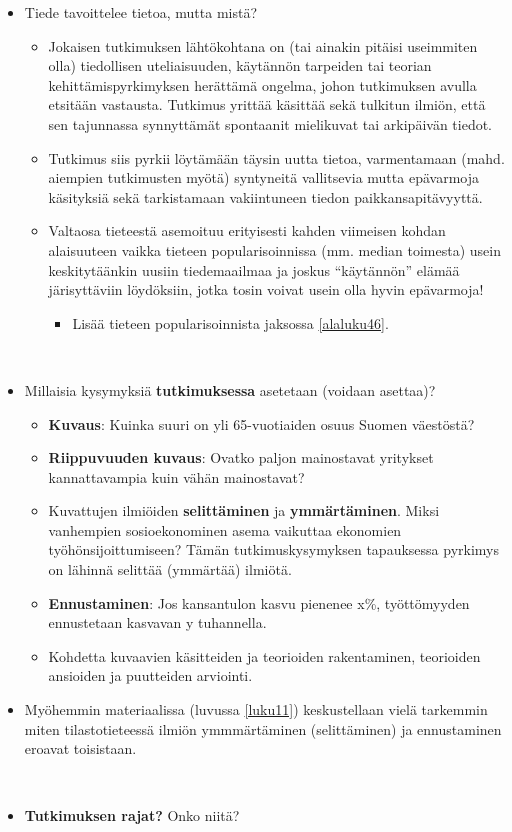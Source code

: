 \documentclass[
]{book}
\providecommand{\tightlist}{%
  \setlength{\itemsep}{0pt}\setlength{\parskip}{0pt}}
\begin{document}
\begin{itemize}
\tightlist
\item
  Tiede tavoittelee tietoa, mutta mistä?

  \begin{itemize}
  \tightlist
  \item
    Jokaisen tutkimuksen lähtökohtana on (tai ainakin pitäisi useimmiten olla) tiedollisen uteliaisuuden, käytännön tarpeiden tai teorian kehittämispyrkimyksen herättämä ongelma, johon tutkimuksen avulla etsitään vastausta. Tutkimus yrittää käsittää sekä tulkitun ilmiön, että sen tajunnassa synnyttämät spontaanit mielikuvat tai arkipäivän tiedot.
  \item
    Tutkimus siis pyrkii löytämään täysin uutta tietoa, varmentamaan (mahd. aiempien tutkimusten myötä) syntyneitä vallitsevia mutta epävarmoja käsityksiä sekä tarkistamaan vakiintuneen tiedon paikkansapitävyyttä.
  \item
    Valtaosa tieteestä asemoituu erityisesti kahden viimeisen kohdan alaisuuteen vaikka tieteen popularisoinnissa (mm. median toimesta) usein keskitytäänkin uusiin tiedemaailmaa ja joskus ``käytännön'' elämää järisyttäviin löydöksiin, jotka tosin voivat usein olla hyvin epävarmoja!

    \begin{itemize}
    \tightlist
    \item
      Lisää tieteen popularisoinnista jaksossa \ref{alaluku46}.\\
      \strut \\
    \end{itemize}
  \end{itemize}
\item
  Millaisia kysymyksiä \textbf{tutkimuksessa} asetetaan (voidaan asettaa)?

  \begin{itemize}
  \tightlist
  \item
    \textbf{Kuvaus}: Kuinka suuri on yli 65-vuotiaiden osuus Suomen väestöstä?
  \item
    \textbf{Riippuvuuden kuvaus}: Ovatko paljon mainostavat yritykset kannattavampia kuin vähän mainostavat?
  \item
    Kuvattujen ilmiöiden \textbf{selittäminen} ja \textbf{ymmärtäminen}. Miksi vanhempien sosioekonominen asema vaikuttaa ekonomien työhönsijoittumiseen? Tämän tutkimuskysymyksen tapauksessa pyrkimys on lähinnä selittää (ymmärtää) ilmiötä.
  \item
    \textbf{Ennustaminen}: Jos kansantulon kasvu pienenee x\%, työttömyyden ennustetaan kasvavan y tuhannella.
  \item
    Kohdetta kuvaavien käsitteiden ja teorioiden rakentaminen, teorioiden ansioiden ja puutteiden arviointi.
  \end{itemize}
\item
  Myöhemmin materiaalissa (luvussa \ref{luku11}) keskustellaan vielä tarkemmin miten tilastotieteessä ilmiön ymmmärtäminen (selittäminen) ja ennustaminen eroavat toisistaan.\\
  \strut \\
\item
  \textbf{Tutkimuksen rajat?} Onko niitä?


\end{itemize}
\end{document}
